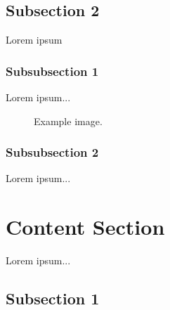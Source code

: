 \documentclass[12pt, spanish]{article}
\begin{document}

\subsection{Subsection 2} %

Lorem ipsum


\subsubsection{Subsubsection 1} %

Lorem ipsum...

\begin{figure}[H] %
\caption{Example image.}
\label{fig:speciation}
\end{figure}


\subsubsection{Subsubsection 2} %

Lorem ipsum...


\section{Content Section} %

Lorem ipsum...


\subsection{Subsection 1} %
\end{document}
